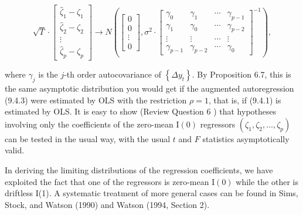 \documentclass[10pt]{article}
\begin{document}
\[
\sqrt{T} \cdot\left[\begin{array}{c}
\hat{\zeta}_{1}-\zeta_{1}  \tag{9.4.27}\\
\hat{\zeta}_{2}-\zeta_{2} \\
\vdots \\
\hat{\zeta}_{p}-\zeta_{p}
\end{array}\right] \rightarrow N\left(\left[\begin{array}{c}
0 \\
0 \\
\vdots \\
0
\end{array}\right], \sigma^{2} \cdot\left[\begin{array}{cccc}
\gamma_{0} & \gamma_{1} & \cdots & \gamma_{p-1} \\
\gamma_{1} & \gamma_{0} & \cdots & \gamma_{p-2} \\
\vdots & \vdots & \cdots & \vdots \\
\gamma_{p-1} & \gamma_{p-2} & \cdots & \gamma_{0}
\end{array}\right]^{-1}\right),
\]

where $\gamma_{j}$ is the $j$-th order autocovariance of $\left\{\Delta y_{t}\right\}$. By Proposition 6.7, this is the same asymptotic distribution you would get if the augmented autoregression (9.4.3) were estimated by OLS with the restriction $\rho=1$, that is, if (9.4.1) is estimated by OLS. It is easy to show (Review Question 6 ) that hypotheses involving only the coefficients of the zero-mean $\mathrm{I}(0)$ regressors $\left(\zeta_{1}, \zeta_{2}, \ldots, \zeta_{p}\right)$ can be tested in the usual way, with the usual $t$ and $F$ statistics asymptotically valid.

In deriving the limiting distributions of the regression coefficients, we have exploited the fact that one of the regressors is zero-mean $\mathrm{I}(0)$ while the other is driftless I(1). A systematic treatment of more general cases can be found in Sims, Stock, and Watson (1990) and Watson (1994, Section 2).
\end{document}
